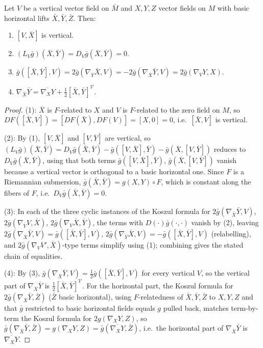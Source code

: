 \begin{proposition}
  \label{prop:pet-ch4-submersion-basic-properties}
  Let $V$ be a vertical vector field on $\bar M$ and $X,Y,Z$ vector fields on
  $M$ with basic horizontal lifts $\bar X,\bar Y,\bar Z$. Then:
  \begin{enumerate}
  \item $[V,\bar X]$ is vertical.
  \item $(L_V\bar g)(\bar X,\bar Y)=D_V\bar g(\bar X,\bar Y)=0$.
  \item $\bar g([\bar X,\bar Y],V)=2\bar g(\nabla_{\bar Y}\bar X,V)=-2\bar g(\nabla_{\bar X}\bar Y,V)=2\bar g(\nabla_VY,X)$.
  \item $\nabla_{\bar X}\bar Y=\overline{\nabla_XY}+\tfrac12[\bar X,\bar Y]^{\mathcal V}$.
  \end{enumerate}
\end{proposition}
\begin{proof}
  (1): $\bar X$ is $F$-related to $X$ and $V$ is $F$-related to the zero field
  on $M$, so $DF([\bar X,V])=[DF(\bar X),DF(V)]=[X,0]=0$, i.e.\ $[\bar X,V]$ is
  vertical.

  (2): By (1), $[V,\bar X]$ and $[V,\bar Y]$ are vertical, so
  $(L_V\bar g)(\bar X,\bar Y)=D_V\bar g(\bar X,\bar Y)-\bar g([V,\bar X],\bar Y)-\bar g(\bar X,[V,\bar Y])$
  reduces to $D_V\bar g(\bar X,\bar Y)$, using that both terms
  $\bar g([V,\bar X],\bar Y)$, $\bar g(\bar X,[V,\bar Y])$ vanish because a
  vertical vector is orthogonal to a basic horizontal one. Since $F$ is a
  Riemannian submersion, $\bar g(\bar X,\bar Y)=g(X,Y)\circ F$, which is
  constant along the fibers of $F$, i.e.\ $D_V\bar g(\bar X,\bar Y)=0$.

  (3): In each of the three cyclic instances of the Koszul formula for
  $2\bar g(\nabla_{\bar X}\bar Y,V)$, $2\bar g(\nabla_{\bar Y}V,\bar X)$,
  $2\bar g(\nabla_V\bar X,\bar Y)$, the terms with $D(\cdot)\bar g(\cdot,\cdot)$
  vanish by (2), leaving
  $2\bar g(\nabla_{\bar X}\bar Y,V)=\bar g([\bar X,\bar Y],V)$,
  $2\bar g(\nabla_{\bar Y}\bar X,V)=-\bar g([\bar X,\bar Y],V)$ (relabelling),
  and $2\bar g(\nabla_VV',\bar X)$-type terms simplify using (1); combining
  gives the stated chain of equalities.

  (4): By (3), $\bar g(\nabla_{\bar X}\bar Y,V)=\tfrac12\bar g([\bar X,\bar Y],V)$
  for every vertical $V$, so the vertical part of $\nabla_{\bar X}\bar Y$ is
  $\tfrac12[\bar X,\bar Y]^{\mathcal V}$. For the horizontal part, the Koszul
  formula for $2\bar g(\nabla_{\bar X}\bar Y,\bar Z)$ ($\bar Z$ basic
  horizontal), using $F$-relatedness of $\bar X,\bar Y,\bar Z$ to $X,Y,Z$ and
  that $\bar g$ restricted to basic horizontal fields equals $g$ pulled back,
  matches term-by-term the Koszul formula for $2g(\nabla_XY,Z)$, so
  $\bar g(\nabla_{\bar X}\bar Y,\bar Z)=g(\nabla_XY,Z)=\bar g(\overline{\nabla_XY},\bar Z)$,
  i.e.\ the horizontal part of $\nabla_{\bar X}\bar Y$ is $\overline{\nabla_XY}$.
\end{proof}

